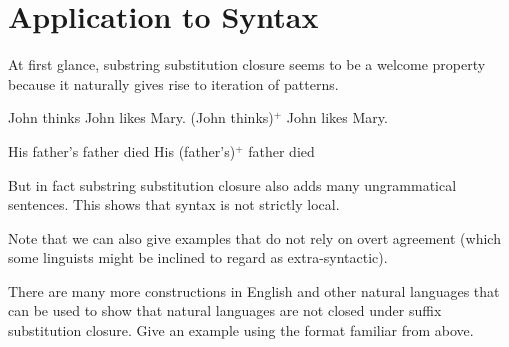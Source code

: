 \section{Application to Syntax}

At first glance, substring substitution closure seems to be a welcome property because it naturally gives rise to iteration of patterns.
%
\begin{exe}
    \ex
    \begin{xlist}
        \ex John thinks John likes Mary.
        \ex (John thinks)$^+$ John likes Mary.
    \end{xlist}
    \ex
    \begin{xlist}
        \ex His father's father died
        \ex His (father's)$^+$ father died
    \end{xlist}
\end{exe}
%
But in fact substring substitution closure also adds many ungrammatical sentences.
This shows that syntax is not strictly local.
%
\begin{exe}
    \ex
    \begin{xlist}
    \end{xlist}
    \ex
    \begin{xlist}
    \end{xlist}
\end{exe}
%
Note that we can also give examples that do not rely on overt agreement (which some linguists might be inclined to regard as extra-syntactic).
%
\begin{exe}
    \ex
    \begin{xlist}
    \end{xlist}
\end{exe}

\begin{exercise}
    There are many more constructions in English and other natural languages that can be used to show that natural languages are not closed under suffix substitution closure.
    Give an example using the format familiar from above.
\end{exercise}

